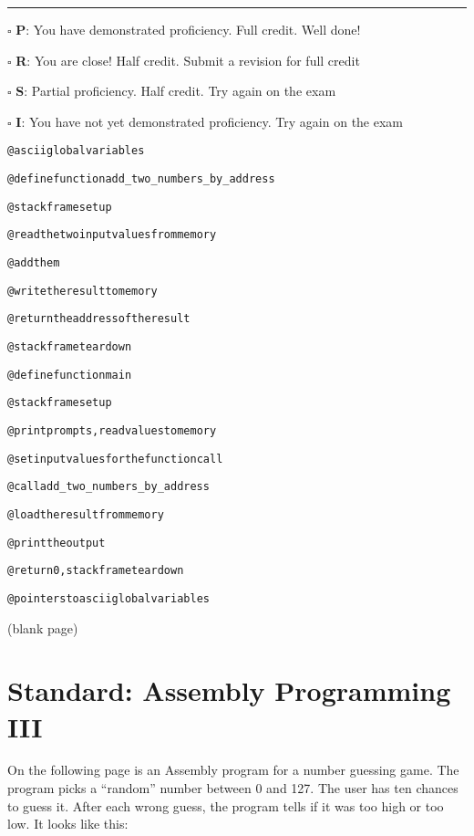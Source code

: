 \documentclass[12pt]{article}
\begin{document}
\vfill

\rule[1ex]{\textwidth}{.1pt}

$\square$ \textbf{P}: You have demonstrated proficiency. Full credit. Well done!

$\square$ \textbf{R}: You are close! Half credit. Submit a revision for full credit

$\square$ \textbf{S}: Partial proficiency. Half credit. Try again on the exam

$\square$ \textbf{I}: You have not yet demonstrated proficiency. Try again on the exam

\newpage

\begin{alltt}
@ ascii global variables

@ define function add_two_numbers_by_address

    @ stack frame setup

    @ read the two input values from memory

    @ add them
    
    @ write the result to memory

    @ return the address of the result

    @ stack frame teardown

@ define function main

    @ stack frame setup

    @ print prompts, read values to memory

    @ set input values for the function call

    @ call add_two_numbers_by_address

    @ load the result from memory

    @ print the output

    @ return 0, stack frame teardown

@ pointers to ascii global variables
\end{alltt}

\newpage

\begin{center}
(blank page)
\end{center}

\newpage

\section*{Standard: Assembly Programming III}

On the following page is an Assembly program for a number guessing game. The program picks a ``random'' number between 0 and 127. The user has ten chances to guess it. After each wrong guess, the program tells if it was too high or too low. It looks like this:
\end{document}
